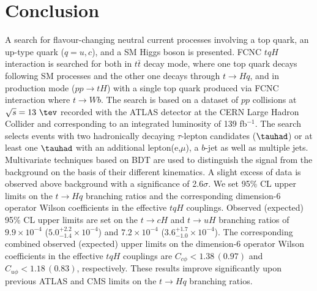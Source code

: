 \section{Conclusion}
\label{sec:conclusion}
A search for flavour-changing neutral current processes involving a top quark, an up-type quark ($q=u, c$), and a SM Higgs boson is presented. FCNC $tqH$ interaction is searched for both in $t\bar{t}$ decay mode, where one top quark decays following SM processes and the other one decays through $t\rightarrow Hq$, and in production mode ($pp\rightarrow tH$) with a single top quark produced via FCNC interaction where $t\to Wb$. The search is based on a dataset of $pp$ collisions at $\sqrt{s}=13~\tev$ recorded with the ATLAS detector at the CERN Large Hadron Collider and corresponding to an integrated luminosity of 139 fb$^{-1}$. The search selects events with two hadronically decaying $\tau$-lepton candidates ($\tauhad$) or at least one $\tauhad$ with an additional lepton(e,$\mu$), a $b$-jet as well as multiple jets. Multivariate techniques based on BDT are used to distinguish the signal from the background on the basis of their different kinematics.
A slight excess of data is observed above background with a significance of 2.6$\sigma$.  
We set 95\% CL upper limits on the $t\to Hq$ branching ratios and the corresponding
dimension-6 operator Wilson coefficients in the effective $tqH$ couplings. 
Observed (expected) 95\% CL upper limits are set on the $t\to cH$ and $t\to uH$ branching ratios of $9.9\times10^{-4}$ ($5.0^{+2.2}_{-1.4}\times10^{-4}$) and $7.2\times10^{-4}$ ($3.6^{+1.7}_{-1.0}\times10^{-4}$).
The corresponding combined observed (expected) upper limits on the dimension-6 operator Wilson coefficients in
the effective $tqH$ couplings are $C_{c\phi} <1.38\, (0.97)$ and $C_{u\phi} <1.18\, (0.83)$, respectively.
These results improve significantly upon previous ATLAS and CMS limits on the $t\rightarrow Hq$ branching ratios.

